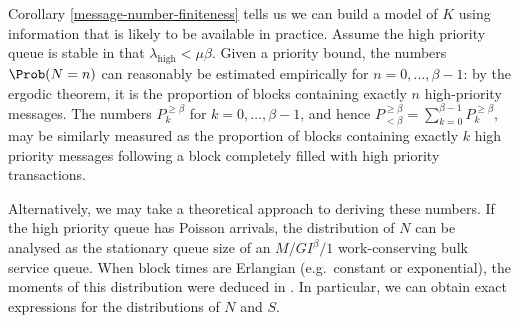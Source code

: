 \documentclass[a4paper,11pt]{article}
\begin{document}
Corollary \ref{message-number-finiteness} tells us we can build a model of $K$ using information that is likely to be available in practice.
%
Assume the high priority queue is stable in that $\lambda_\mathrm{high} < \mu\beta$.
%
Given a priority bound, the numbers $\Prob(N=n)$ can reasonably be estimated empirically for $n=0,\ldots,\beta-1$: by the ergodic theorem, it is the proportion of blocks containing exactly $n$ high-priority messages.
%
The numbers $P^{\geq\beta}_k$ for $k=0,\ldots,\beta-1$, and hence $P^{\geq\beta}_{<\beta}= \sum_{k=0}^{\beta-1}P^{\geq\beta}_k$, may be similarly measured as the proportion of blocks containing exactly $k$ high priority messages following a block completely filled with high priority transactions.

Alternatively, we may take a theoretical approach to deriving these numbers. If the high priority queue has Poisson arrivals, the distribution of $N$ can be analysed as the stationary queue size of an $M/GI^\beta/1$ work-conserving bulk service queue.
%
When block times are Erlangian (e.g.~constant or exponential), the moments of this distribution were deduced in \cite{bailey1954queueing}.
%
In particular, we can obtain exact expressions for the distributions of $N$ and $S$.
    
\end{document}
